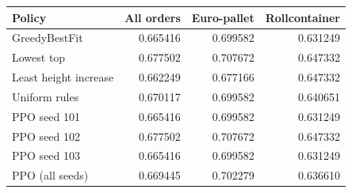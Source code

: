 \begin{tabular}{lrrr}
\hline
Policy & All orders & Euro-pallet & Rollcontainer \\
\hline
GreedyBestFit & 0.665416 & 0.699582 & 0.631249 \\
Lowest top & 0.677502 & 0.707672 & 0.647332 \\
Least height increase & 0.662249 & 0.677166 & 0.647332 \\
Uniform rules & 0.670117 & 0.699582 & 0.640651 \\
PPO seed 101 & 0.665416 & 0.699582 & 0.631249 \\
PPO seed 102 & 0.677502 & 0.707672 & 0.647332 \\
PPO seed 103 & 0.665416 & 0.699582 & 0.631249 \\
PPO (all seeds) & 0.669445 & 0.702279 & 0.636610 \\
\hline
\end{tabular}
